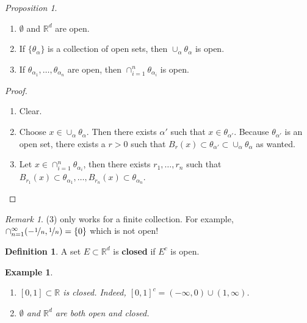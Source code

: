 \documentclass[a4paper, 11pt]{book}
\newtheorem*{example}{Example}
\theoremstyle{definition}
\newtheorem{definition}{Definition}[section]
\theoremstyle{remark}
\newtheorem*{remark}{Remark}
\newtheorem{prop}{Proposition}
\begin{document}
    \begin{prop}
        \begin{enumerate}
            \item $\emptyset$ and $\mathbb{R}^d$ are open.
            \item If $\{\theta_{\alpha}\}$ is a collection of open sets, then $\cup_{\alpha}\theta_{\alpha}$ is open.
            \item If $\theta_{\alpha_1},\hdots,\theta_{\alpha_n}$ are open, then $\cap_{i=1}^n \theta_{\alpha_i}$ is open.
        \end{enumerate}
    \end{prop}
    \begin{proof}
        \begin{enumerate}
            \item Clear.
            \item Choose $x\in\cup_{\alpha}\theta_{\alpha}$. Then there exists $\alpha'$ such that $x\in \theta_{\alpha'}$. Because
                $\theta_{\alpha'}$ is an open set, there exists a $r>0$ such that 
                $B_r(x)\subset\theta_{\alpha'}\subset\cup_{\alpha}\theta_{\alpha}$ as wanted.
            \item Let $x\in\cap_{i=1}^n \theta_{\alpha_i}$, then there exists $r_1,\hdots,r_n$ such that 
                $B_{r_1}(x)\subset\theta_{\alpha_1},\hdots,B_{r_n}(x)\subset\theta_{\alpha_n}$.
        \end{enumerate}
    \end{proof}

    \begin{remark}
        (3) only works for a finite collection. For example, $\cap_{n=1}^{\infty} (-\nicefrac{1}{n},\nicefrac{1}{n}) = \{0\}$ which
        is not open!
    \end{remark}

    \begin{definition}
        A set $E\subset \mathbb{R}^d$ is \textbf{closed} if $E^c$ is open.
    \end{definition}

    \begin{example}
        \begin{enumerate}
            \item $[0,1]\subset\mathbb{R}$ is closed. Indeed, $[0,1]^c = (-\infty, 0) \cup (1,\infty)$.
            \item $\emptyset$ and $\mathbb{R}^d$ are both open and closed.
        \end{enumerate}
    \end{example}
\end{document}

